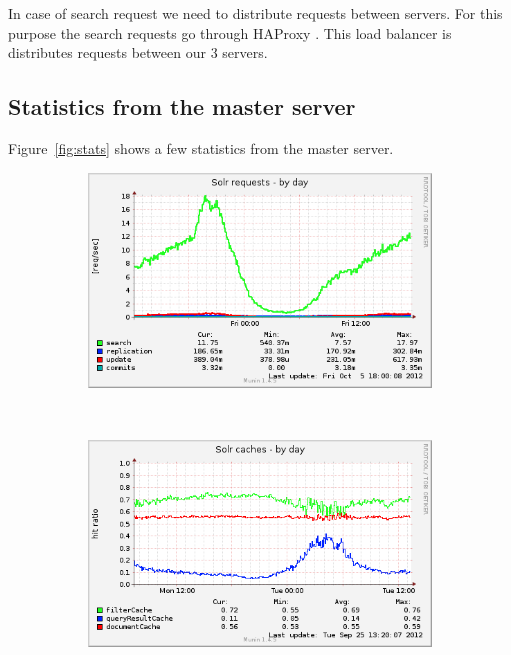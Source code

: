 \documentclass[10pt,a4paper]{article}
\begin{document}
In case of search request we need to distribute requests between servers. For this purpose the search requests go through HAProxy \cite{HAPROXY}. This load balancer is distributes requests between our 3 servers.

\subsection{Statistics from the master server}

Figure~\ref{fig:stats} shows a few statistics from the master server.

\begin{figure}
        \centering
        \begin{subfigure}[b]{0.45\textwidth}
                \centering
                \includegraphics[width=\textwidth]{solr_users_reqs-day}
                \label{fig:solr_users_reqs-day}
        \end{subfigure}%
        ~ %
        \begin{subfigure}[b]{0.45\textwidth}
                \centering
                \includegraphics[width=\textwidth]{solr_users_cache-day}
                \label{fig:solr_users_cache-day}
        \end{subfigure}
                

\end{figure}
\end{document}
